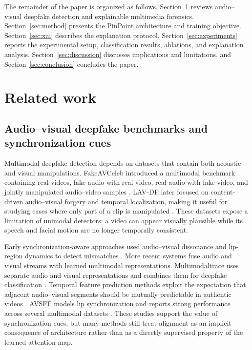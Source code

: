 \documentclass[preprint,12pt,number]{elsarticle}
\begin{document}
The remainder of the paper is organized as follows. Section~\ref{sec:related} reviews audio--visual deepfake detection and explainable multimedia forensics. Section~\ref{sec:method} presents the PinPoint architecture and training objective. Section~\ref{sec:xai} describes the explanation protocol. Section~\ref{sec:experiments} reports the experimental setup, classification results, ablations, and explanation analysis. Section~\ref{sec:discussion} discusses implications and limitations, and Section~\ref{sec:conclusion} concludes the paper.

\section{Related work}
\label{sec:related}

\subsection{Audio--visual deepfake benchmarks and synchronization cues}
\label{subsec:benchmarks}

Multimodal deepfake detection depends on datasets that contain both acoustic and visual manipulations. FakeAVCeleb introduced a multimodal benchmark containing real videos, fake audio with real video, real audio with fake video, and jointly manipulated audio--video samples \cite{khalid2021fakeavceleb}. LAV-DF later focused on content-driven audio--visual forgery and temporal localization, making it useful for studying cases where only part of a clip is manipulated \cite{cai2022lavdf}. These datasets expose a limitation of unimodal detectors: a video can appear visually plausible while its speech and facial motion are no longer temporally consistent.

Early synchronization-aware approaches used audio--visual dissonance and lip-region dynamics to detect mismatches \cite{chugh2020notmade,haliassos2021lips}. More recent systems fuse audio and visual streams with learned multimodal representations. Multimodaltrace uses separate audio and visual representations and combines them for deepfake classification \cite{raza2023multimodaltrace}. Temporal feature prediction methods exploit the expectation that adjacent audio--visual segments should be mutually predictable in authentic videos \cite{gao2024temporal}. AVSFF models lip synchronization and reports strong performance across several multimodal datasets \cite{javed2025avsff}. These studies support the value of synchronization cues, but many methods still treat alignment as an implicit consequence of architecture rather than as a directly supervised property of the learned attention map.
\end{document}
